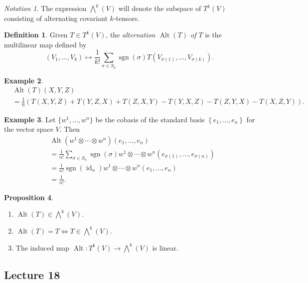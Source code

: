 \documentclass[10pt,letterpaper,cm]{nupset}
\theoremstyle{definition}
\newtheorem{definition}{Definition}[subsection]
\newtheorem{exmp}[definition]{Example}
\theoremstyle{theorem}
\newtheorem{prop}[definition]{Proposition}
\theoremstyle{remark}
\newtheorem*{notation}{Notation}
\newcommand{\1}{\mathbf{1}}
\newcommand{\0}{\vec 0}
\DeclareMathOperator{\id}{id}
\DeclareMathOperator{\Alt}{Alt}
\DeclareMathOperator{\sgn}{sgn}
\begin{document}
\begin{notation}
The  expression $\bigwedge^k(V)$ will denote the subspace of $T^k(V)$ consisting of alternating covariant $k$-tensors. 
\end{notation}

\begin{definition}
Given $T\in T^k(V)$, the \textit{alternation $\Alt(T)$ of $T$} is the multilinear map defined by $$ (V_1, \ldots, V_k) \mapsto \frac{1}{k!} \sum_{\sigma \in S_k} \sgn(\sigma) T\left(V_{\sigma(1)}, \ldots, V_{\sigma(k)}\right).$$
\end{definition}

\begin{exmp}
\begin{align*}
& \Alt(T)(X, Y, Z) 
\\ & = \frac{1}{6}\left(T(X, Y, Z) + T(Y, Z, X) + T(Z, X, Y)  -T(Y, X, Z)- T(Z, Y, X) -T(X, Z, Y)\right).
\end{align*}
\end{exmp}


\begin{exmp}\label{fact}
Let $\{w^1, \ldots, w^n\}$ be the cobasis of the standard basis $ \left\{e_1, \ldots, e_n\right\}$ for the vector space $V$. Then
\begin{align*}
& \Alt(w^1 \otimes \cdots \otimes w^n)(e_1, \ldots, e_n)\\ & = \frac{1}{n!} \sum_{\sigma \in S_n} \sgn(\sigma)w^1 \otimes \cdots \otimes w^n\left(e_{\sigma(1)}, \ldots, e_{\sigma(n)}\right) \\ & =  \frac{1}{n!} \sgn\left(\id_n\right) w^1 \otimes \cdots \otimes w^n\left(e_{1}, \ldots, e_{n}\right) 
\\ & = \frac{1}{n!}.
\end{align*}
\end{exmp}

\begin{prop}\label{alt} $ $
\begin{enumerate}
\item $\Alt(T) \in \bigwedge^k(V)$.
\item $\Alt(T) = T \iff T \in \bigwedge^k(V)$.
\item The induced map $\Alt : T^k(V) \to \bigwedge^k(V)$ is linear. 
\end{enumerate}
\end{prop}

\subsection{Lecture 18}
\end{document}
